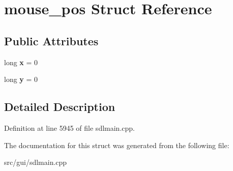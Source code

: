 \hypertarget{structmouse__pos}{\section{mouse\-\_\-pos Struct Reference}
\label{structmouse__pos}
}
\subsection*{Public Attributes}
\begin{DoxyCompactItemize}
\item 
\hypertarget{structmouse__pos_a87e6dd58ae6e8c7d1aabb6892b9d6f01}{long {\bfseries x} = 0}\label{structmouse__pos_a87e6dd58ae6e8c7d1aabb6892b9d6f01}

\item 
\hypertarget{structmouse__pos_a5c8305dffdd8ece94010679489de824d}{long {\bfseries y} = 0}\label{structmouse__pos_a5c8305dffdd8ece94010679489de824d}

\end{DoxyCompactItemize}


\subsection{Detailed Description}


Definition at line 5945 of file sdlmain.\-cpp.



The documentation for this struct was generated from the following file\-:\begin{DoxyCompactItemize}
\item 
src/gui/sdlmain.\-cpp\end{DoxyCompactItemize}
